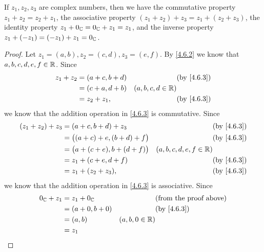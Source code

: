 \begin{lem}\label{4.6.4}
  If \(z_1, z_2, z_3\) are complex numbers, then we have the commutative property \(z_1 + z_2 = z_2 + z_1\), the associative property \((z_1 + z_2) + z_3 = z_1 + (z_2 + z_3)\), the identity property \(z_1 + 0_{\mathbb{C}} = 0_{\mathbb{C}} + z_1 = z_1\), and the inverse property \(z_1 + (-z_1) = (-z_1) + z_1 = 0_{\mathbb{C}}\).
\end{lem}

\begin{proof}
  Let \(z_1 = (a, b), z_2 = (c, d), z_3 = (e, f)\).
  By \cref{4.6.2} we know that \(a, b, c, d, e, f \in \mathbb{R}\).
  Since
  \begin{align*}
    z_1 + z_2 & = (a + c, b + d) &                     & \text{(by \cref{4.6.3})} \\
              & = (c + a, d + b) & (a, b, c, d \in \R)                            \\
              & = z_2 + z_1,     &                     & \text{(by \cref{4.6.3})}
  \end{align*}
  we know that the addition operation in \cref{4.6.3} is commutative.
  Since
  \begin{align*}
    (z_1 + z_2) + z_3 & = (a + c, b + d) + z_3               &                           & \text{(by \cref{4.6.3})} \\
                      & = \big((a + c) + e, (b + d) + f\big) &                           & \text{(by \cref{4.6.3})} \\
                      & = \big(a + (c + e), b + (d + f)\big) & (a, b, c, d, e, f \in \R)                            \\
                      & = z_1 + (c + e, d + f)               &                           & \text{(by \cref{4.6.3})} \\
                      & = z_1 + (z_2 + z_3),                 &                           & \text{(by \cref{4.6.3})}
  \end{align*}
  we know that the addition operation in \cref{4.6.3} is associative.
  Since
  \begin{align*}
    0_{\C} + z_1 & = z_1 + 0_{\C}   &                  & \text{(from the proof above)} \\
                 & = (a + 0, b + 0) &                  & \text{(by \cref{4.6.3})}      \\
                 & = (a, b)         & (a, b, 0 \in \R)                                 \\
                 & = z_1

\end{align*}
\end{proof}
